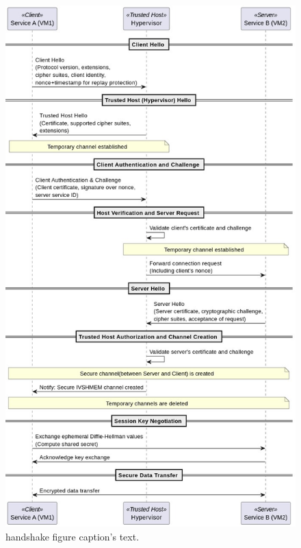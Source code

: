 \documentclass[letterpaper,twocolumn,10pt]{article}
\begin{document}
\begin{figure}[ht]
\begin{center}
  \includegraphics[width=0.95\linewidth]{./figures/ivshmem_handshake.png}
\end{center}
\caption{\label{fig:handshake} handshake figure 
  caption's text. }
\end{figure}
\end{document}
